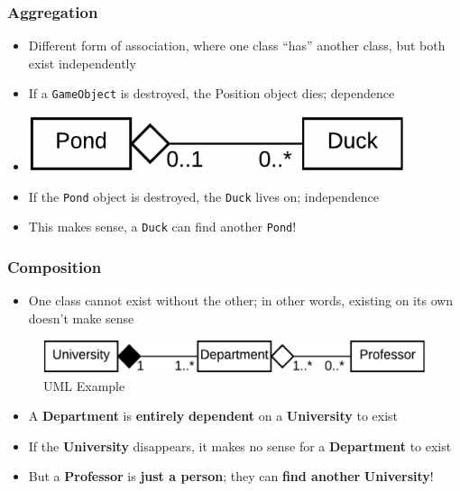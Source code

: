 \documentclass[]{article}
\providecommand{\tightlist}{%
  \setlength{\itemsep}{0pt}\setlength{\parskip}{0pt}}
\begin{document}
\hypertarget{aggregation}{%
\subsubsection{Aggregation}\label{aggregation}}

\begin{itemize}
\tightlist
\item
  Different form of association, where one class ``has'' another class,
  but both exist independently
\item
  If a \texttt{GameObject} is destroyed, the Position object dies;
  dependence
\item
  \includegraphics{images/uml7.png}
\item
  If the \texttt{Pond} object is destroyed, the \texttt{Duck} lives on;
  independence
\item
  This makes sense, a \texttt{Duck} can find another \texttt{Pond}!
\end{itemize}

\hypertarget{composition}{%
\subsubsection{Composition}\label{composition}}

\begin{itemize}
\tightlist
\item
  One class cannot exist without the other; in other words, existing on
  its own doesn't make sense
\end{itemize}

\begin{figure}
\centering
\includegraphics{images/uml8.png}
\caption{UML Example}
\end{figure}

\begin{itemize}
\item
  A \textbf{Department} is \textbf{entirely} \textbf{dependent} on a
  \textbf{University} to exist
\item
  If the \textbf{University} disappears, it makes no sense for a
  \textbf{Department} to exist
\item
  But a \textbf{Professor} is \textbf{just a person}; they can
  \textbf{find another} \textbf{University}!
\end{itemize}
\end{document}
